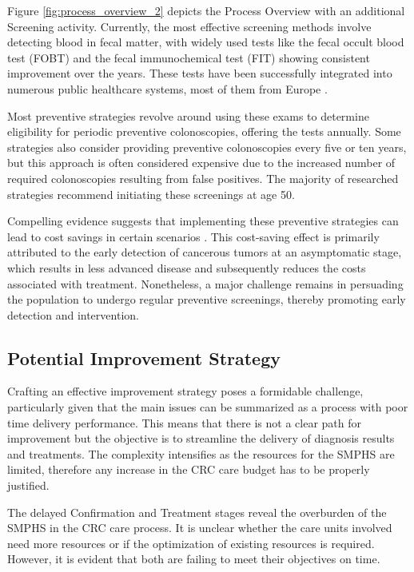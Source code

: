 Figure \ref{fig:process_overview_2} depicts the Process Overview with an additional Screening activity. Currently, the most effective screening methods involve detecting blood in fecal matter, with widely used tests like the fecal occult blood test (FOBT) and the fecal immunochemical test (FIT) showing consistent improvement over the years. These tests have been successfully integrated into numerous public healthcare systems, most of them from Europe \cite{navarro_colorectal_2017}. 

Most preventive strategies revolve around using these exams to determine eligibility for periodic preventive colonoscopies, offering the tests annually. Some strategies also consider providing preventive colonoscopies every five or ten years, but this approach is often considered expensive due to the increased number of required colonoscopies resulting from false positives. The majority of researched strategies recommend initiating these screenings at age 50.

Compelling evidence suggests that implementing these preventive strategies can lead to cost savings in certain scenarios \cite{lansdorp-vogelaar_effect_2009}. This cost-saving effect is primarily attributed to the early detection of cancerous tumors at an asymptomatic stage, which results in less advanced disease and subsequently reduces the costs associated with treatment. Nonetheless, a major challenge remains in persuading the population to undergo regular preventive screenings, thereby promoting early detection and intervention.

\subsection*{Potential Improvement Strategy}

Crafting an effective improvement strategy poses a formidable challenge, particularly given that the main issues can be summarized as a process with poor time delivery performance. This means that there is not a clear path for improvement but the objective is to streamline the delivery of diagnosis results and treatments. The complexity intensifies as the resources for the SMPHS are limited, therefore any increase in the CRC care budget has to be properly justified. 

The delayed Confirmation and Treatment stages reveal the overburden of the SMPHS in the CRC care process. It is unclear whether the care units involved need more resources or if the optimization of existing resources is required. However, it is evident that both are failing to meet their objectives on time.

